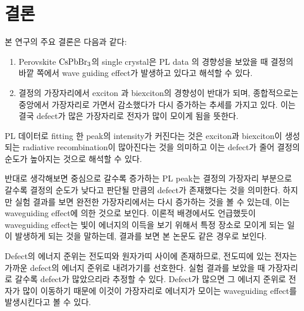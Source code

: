 \newpage

\section{결론	}
본 연구의 주요 결론은 다음과 같다:
\begin{enumerate}
	\item Perovskite $\rm CsPbBr_3$의 single crystal은 PL data 의 경향성을 보았을 때 결정의 바깥 쪽에서 wave guiding effect가 발생하고 있다고 해석할 수 있다.
	\item 결정의 가장자리에서 exciton 과 biexciton의 경향성이 반대가 되며, 종합적으로는 중앙에서 가장자리로 가면서 감소했다가 다시 증가하는 추세를 가지고 있다. 이는 결국 defect가 많은 가장자리로 전자가 많이 모이게 됨을 뜻한다.
\end{enumerate}
PL 데이터로 fitting 한 peak의 intensity가 커진다는 것은 exciton과 biexciton이 생성되는 radiative recombination이 많아진다는 것을 의미하고 이는 defect가 줄어 결정의 순도가 높아지는 것으로 해석할 수 있다.

반대로 생각해보면 중심으로 갈수록 증가하는 PL peak는 결정의 가장자리 부분으로 갈수록 결정의 순도가 낮다고 판단될 만큼의 defect가 존재했다는 것을 의미한다. 하지만 실험 결과를 보면 완전한 가장자리에서는 다시 증가하는 것을 볼 수 있는데, 이는 waveguiding effect에 의한 것으로 보인다. 이론적 배경에서도 언급했듯이 waveguiding effect는 빛이 에너지의 이득을 보기 위해서 특정 장소로 모이게 되는 일이 발생하게 되는 것을 말하는데, 결과를 보면 본 논문도 같은 경우로 보인다.

Defect의 에너지 준위는 전도띠와 원자가띠 사이에 존재하므로, 전도띠에 있는 전자는 가까운 defect의 에너지 준위로 내려가기를 선호한다. 실험 결과를 보았을 때 가장자리로 갈수록 defect가 많았으리라 추정할 수 있다. Defect가 많으면 그 에너지 준위로 전자가 많이 이동하기 때문에 이것이 가장자리로 에너지가 모이는 waveguiding effect를 발생시킨다고 볼 수 있다.